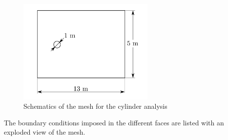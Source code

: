 \newpage

    \begin{figure}[h!]
        \centering
        \includegraphics[width=0.6\textwidth]{Figures/3/cylinderMesh.png}
        \caption{Schematics of the mesh for the cylinder analysis}
        \label{fig:cylMeshSChematics}
    \end{figure}


The boundary conditions imposed in the different faces are listed with an exploded view of the mesh. 

